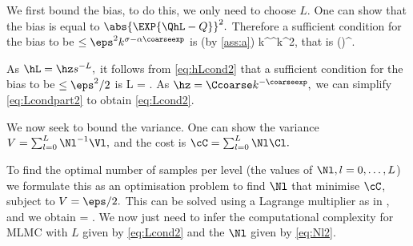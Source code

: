 We first bound the bias, to do this, we only need to choose $L.$ One can show that the bias is equal to $\abs{\EXP{\QhL - Q}}^2.$ Therefore a sufficient condition for the bias to be $\leq \eps^2k^{\sigma-\alpha\coarseexp}$ is (by \cref{ass:a})
\beqs
\co k^\sigma \hL^\alpha \leq \eps k^{\frac{\sigma-\alpha\coarseexp}2},
\eeqs
that is
\beq\label{eq:hLcond2}
\hL \leq \mleft(\mright)^{\alpha}.
\eeq
{}

As $\hL = \hz s^{-L},$ it follows from \eqref{eq:hLcond2} that a sufficient condition for the bias to be $\leq \eps^2/2$ is
\beq\label{eq:Lcondpart2}
L = .
\eeq
As $\hz = \Ccoarse k^{-\coarseexp},$ we can simplify \eqref{eq:Lcondpart2} to obtain \eqref{eq:Lcond2}.

We now seek to bound the variance. One can show the variance $V = \sum_{l=0}^L \Nl^{-1} \Vl,$ and the cost is $\cC = \sum_{l=0}^L \Nl \Cl.$

To find the optimal number of samples per level (the values of $\Nl, l=0,\ldots,L$) we formulate this as an optimisation problem to find $\Nl$ that minimise $\cC$, subject to $V=\eps/2.$ This can be solved using a Lagrange multiplier as in \cite{Gi:15}, and we obtain
\beq\label{eq:Nl2}
\Nl = .
\eeq
{}
We now just need to infer the computational complexity for MLMC with $L$ given by \eqref{eq:Lcond2} and the $\Nl$ given by \eqref{eq:Nl2}.


